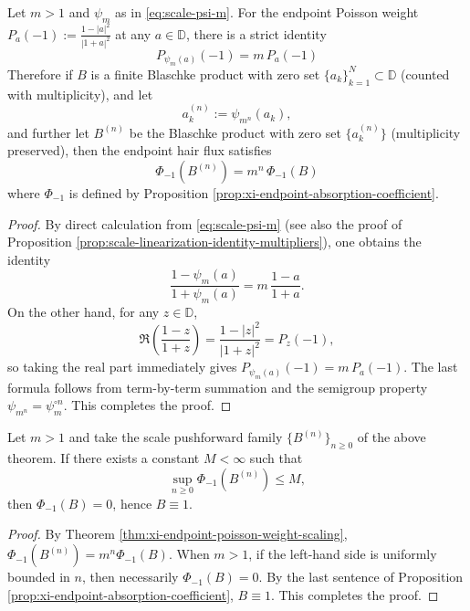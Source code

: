 \begin{theorem}\label{thm:xi-endpoint-poisson-weight-scaling}
Let \(m>1\) and \(\psi_m\) as in \eqref{eq:scale-psi-m}.
For the endpoint Poisson weight
\(
P_a(-1):=\frac{1-|a|^2}{|1+a|^2}
\)
at any \(a\in\mathbb{D}\), there is a strict identity
\[
\boxed{\;P_{\psi_m(a)}(-1)=m\,P_a(-1)\;}
\]
Therefore if \(B\) is a finite Blaschke product with zero set \(\{a_k\}_{k=1}^{N}\subset\mathbb{D}\) (counted with multiplicity), and let
\[
a_k^{(n)}:=\psi_{m^n}(a_k),
\]
and further let \(B^{(n)}\) be the Blaschke product with zero set \(\{a_k^{(n)}\}\) (multiplicity preserved), then the endpoint hair flux satisfies
\[
\boxed{\;\Phi_{-1}(B^{(n)})=m^n\,\Phi_{-1}(B)\;}
\]
where \(\Phi_{-1}\) is defined by Proposition \ref{prop:xi-endpoint-absorption-coefficient}.
\end{theorem}

\begin{proof}
By direct calculation from \eqref{eq:scale-psi-m} (see also the proof of Proposition \ref{prop:scale-linearization-identity-multipliers}), one obtains the identity
\[
\frac{1-\psi_m(a)}{1+\psi_m(a)}=m\,\frac{1-a}{1+a}.
\]
On the other hand, for any \(z\in\mathbb{D}\),
\[
\Re\!\left(\frac{1-z}{1+z}\right)=\frac{1-|z|^2}{|1+z|^2}=P_z(-1),
\]
so taking the real part immediately gives \(P_{\psi_m(a)}(-1)=m\,P_a(-1)\).
The last formula follows from term-by-term summation and the semigroup property \(\psi_{m^n}=\psi_m^{\circ n}\). This completes the proof.
\end{proof}

\begin{corollary}[Cross-scale closure \texorpdfstring{$\Longrightarrow$}{=>} no-hair fixed point]\label{cor:xi-nohair-fixedpoint-flux-closure}
Let \(m>1\) and take the scale pushforward family \(\{B^{(n)}\}_{n\ge 0}\) of the above theorem.
If there exists a constant \(M<\infty\) such that
\[
\sup_{n\ge 0}\Phi_{-1}(B^{(n)})\le M,
\]
then \(\Phi_{-1}(B)=0\), hence \(B\equiv 1\).
\end{corollary}

\begin{proof}
By Theorem \ref{thm:xi-endpoint-poisson-weight-scaling}, \(\Phi_{-1}(B^{(n)})=m^n\Phi_{-1}(B)\).
When \(m>1\), if the left-hand side is uniformly bounded in \(n\), then necessarily \(\Phi_{-1}(B)=0\).
By the last sentence of Proposition \ref{prop:xi-endpoint-absorption-coefficient}, \(B\equiv 1\). This completes the proof.
\end{proof}

